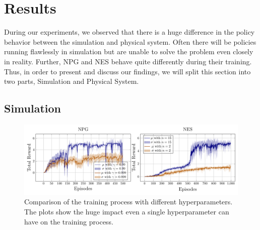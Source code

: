 \section{Results}
\label{results}
During our experiments, we observed that there is a huge difference in the policy behavior between the simulation and physical system. Often there will be policies running flawlessly in simulation but are unable to solve the problem even closely in reality. Further, NPG and NES behave quite differently during their training. Thus, in order to present and discuss our findings, we will split this section into two parts, Simulation and Physical System.

\subsection{Simulation}
\label{sim}

\begin{figure}
\centering
\includegraphics[scale=.5]{plots/qube_compare.pdf}
\caption{Comparison of the training process with different hyperparameters. The plots show the huge impact even a single hyperparameter can have on the training process.}
\label{fig:NPG_training}
\end{figure}

